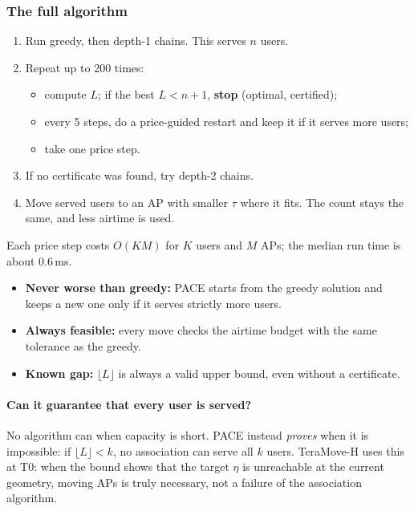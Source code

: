 \documentclass[11pt,a4paper]{article}
\begin{document}
\subsubsection*{The full algorithm}
\begin{enumerate}
\item Run greedy, then depth-1 chains. This serves $n$ users.
\item Repeat up to 200 times:
  \begin{itemize}
  \item compute $L$; if the best $L<n+1$, \textbf{stop} (optimal, certified);
  \item every 5 steps, do a price-guided restart and keep it if it serves more users;
  \item take one price step.
  \end{itemize}
\item If no certificate was found, try depth-2 chains.
\item Move served users to an AP with smaller $\tau$ where it fits. The count stays the same,
  and less airtime is used.
\end{enumerate}
Each price step costs $O(KM)$ for $K$ users and $M$ APs; the median run time is about
0.6\,ms.

\begin{keybox}[Guarantees]
\begin{itemize}
\item \textbf{Never worse than greedy:} PACE starts from the greedy solution and keeps a new one only if it serves strictly more users.
\item \textbf{Always feasible:} every move checks the airtime budget with the same tolerance as the greedy.
\item \textbf{Known gap:} $\lfloor L\rfloor$ is always a valid upper bound, even without a certificate.
\end{itemize}
\end{keybox}

\paragraph{Can it guarantee that every user is served?}
No algorithm can when capacity is short. PACE instead \emph{proves} when it is impossible:
if $\lfloor L\rfloor<k$, no association can serve all $k$ users. TeraMove-H uses this at T0:
when the bound shows that the target $\eta$ is unreachable at the current geometry, moving APs
is truly necessary, not a failure of the association algorithm.
\end{document}
